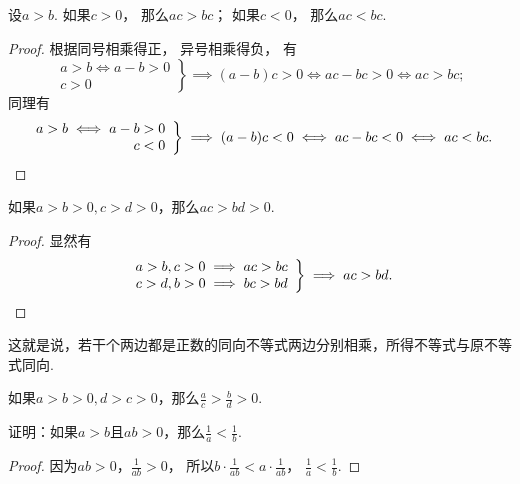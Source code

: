 \begin{theorem}
设\(a>b\).
如果\(c>0\)，
那么\(ac>bc\)；
如果\(c<0\)，
那么\(ac<bc\).
\begin{proof}
根据同号相乘得正，
异号相乘得负，
有\[
	\left. \begin{array}{r}
		a>b \iff a-b>0 \\
		c>0
	\end{array} \right\}
	\implies (a-b)c>0
	\iff ac-bc>0
	\iff ac>bc;
\]
同理有\[
	\left. \begin{array}{r}
		a>b \iff a-b> 0 \\
		c<0
	\end{array} \right\}
	\implies (a-b)c<0
	\iff ac-bc<0
	\iff ac<bc.
	\qedhere
\]
\end{proof}
\end{theorem}

\begin{corollary}\label{theorem:不等式.同向不等式相乘}
如果\(a>b>0,c>d>0\)，那么\(ac>bd>0\).
\begin{proof}
显然有\[
	\left. \begin{array}{r}
		a>b,c>0 \implies ac>bc \\
		c>d,b>0 \implies bc>bd
	\end{array} \right\}
	\implies ac>bd.
	\qedhere
\]
\end{proof}
\end{corollary}
这就是说，若干个两边都是正数的同向不等式两边分别相乘，所得不等式与原不等式同向.

\begin{corollary}
如果\(a>b>0,d>c>0\)，那么\(\frac{a}{c}>\frac{b}{d}>0\).
\end{corollary}

\begin{example}
证明：如果\(a > b\)且\(ab > 0\)，那么\(\frac1a < \frac1b\).
\begin{proof}
因为\(ab > 0\)，\(\frac1{ab} > 0\)，
所以\(b \cdot \frac1{ab} < a \cdot \frac1{ab}\)，
\(\frac1a < \frac1b\).
\end{proof}
\end{example}

